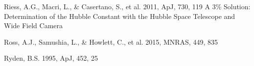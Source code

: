 \documentclass[iop]{emulateapj}
\begin{document}
\begin{thebibliography}{}

Riess, A.G., Macri, L., \& Casertano, S., et al. 2011, ApJ, 730, 119
A 3\% Solution: Determination of the Hubble Constant with the Hubble Space Telescope and Wide Field Camera


Ross, A.J., Samushia, L., \& Howlett, C., et al. 2015, MNRAS, 449, 835

Ryden, B.S. 1995, ApJ, 452, 25  















\end{thebibliography}
\end{document}
